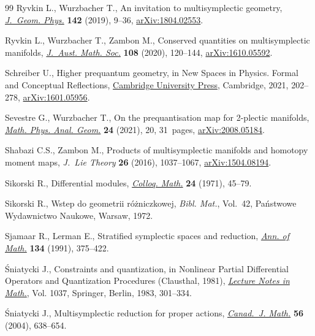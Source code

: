 \documentclass[pdftex]{sigma}
\numberwithin{equation}{section}
\begin{document}
\begin{thebibliography}{99}
Ryvkin L., Wurzbacher T., An invitation to multisymplectic geometry,
  \href{https://doi.org/10.1016/j.geomphys.2019.03.006}{\textit{J.~Geom. Phys.}} \textbf{142} (2019), 9--36, \href{https://arxiv.org/abs/1804.02553}{arXiv:1804.02553}.

Ryvkin L., Wurzbacher T., Zambon M., Conserved quantities on multisymplectic
  manifolds, \href{https://doi.org/10.1017/s1446788718000381}{\textit{J.~Aust. Math. Soc.}} \textbf{108} (2020), 120--144,
  \href{https://arxiv.org/abs/1610.05592}{arXiv:1610.05592}.

Schreiber U., Higher prequantum geometry, in New Spaces in Physics. Formal and
  Conceptual Reflections, \href{https://doi.org/10.1017/9781108854399.008}{Cambridge University Press}, Cambridge, 2021,
  202--278, \href{https://arxiv.org/abs/1601.05956}{arXiv:1601.05956}.

Sevestre G., Wurzbacher T., On the prequantisation map for 2-plectic manifolds,
  \href{https://doi.org/10.1007/s11040-021-09391-5}{\textit{Math. Phys. Anal. Geom.}} \textbf{24} (2021), 20, 31~pages,
  \href{https://arxiv.org/abs/2008.05184}{arXiv:2008.05184}.

Shabazi C.S., Zambon M., Products of multisymplectic manifolds and homotopy
  moment maps, \textit{J.~Lie Theory} \textbf{26} (2016), 1037--1067,
  \href{https://arxiv.org/abs/1504.08194}{arXiv:1504.08194}.

Sikorski R., Differential modules, \href{https://doi.org/10.4064/cm-24-1-45-79}{\textit{Colloq. Math.}} \textbf{24} (1971),
  45--79.

Sikorski R., Wstep do geometrii r\'o\.zniczkowej, \textit{Bibl. Mat.}, Vol.~42,
  Pa\'nstwowe Wydawnictwo Naukowe, Warsaw, 1972.

Sjamaar R., Lerman E., Stratified symplectic spaces and reduction, \href{https://doi.org/10.2307/2944350}{\textit{Ann.
  of Math.}} \textbf{134} (1991), 375--422.

\'Sniatycki J., Constraints and quantization, in Nonlinear Partial Differential
  Operators and Quantization Procedures ({C}lausthal, 1981), \href{https://doi.org/10.1007/BFb0073178}{\textit{Lecture
  Notes in Math.}}, Vol. 1037, Springer, Berlin, 1983, 301--334.

\'Sniatycki J., Multisymplectic reduction for proper actions, \href{https://doi.org/10.4153/CJM-2004-029-8}{\textit{Canad.~J.
  Math.}} \textbf{56} (2004), 638--654.


\end{thebibliography}
\end{document}
